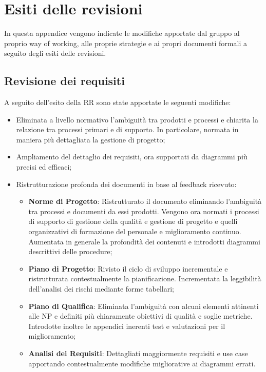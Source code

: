 \documentclass[openany,12pt,a4paper]{report}
\begin{document}
\chapter{Esiti delle revisioni}

In questa appendice vengono indicate le modifiche apportate dal gruppo al proprio way of working, alle proprie strategie e ai propri documenti formali a seguito degli esiti delle revisioni.

\section{Revisione dei requisiti}

A seguito dell'esito della RR sono state apportate le seguenti modifiche:

\begin{itemize}
	\item Eliminata a livello normativo l’ambiguità tra prodotti e processi e chiarita la relazione tra processi primari e di supporto. In particolare, normata in maniera più dettagliata la gestione di progetto;
	\item Ampliamento del dettaglio dei requisiti, ora supportati da diagrammi più precisi ed efficaci;
	\item Ristrutturazione profonda dei documenti in base al feedback ricevuto:
	\begin{itemize}
		\item \textbf{Norme di Progetto}: Ristrutturato il documento eliminando l'ambiguità tra processi e documenti da essi prodotti. Vengono ora normati i processi di supporto di gestione della qualità e gestione di progetto e quelli organizzativi di formazione del personale e miglioramento continuo. Aumentata in generale la profondità dei contenuti e introdotti diagrammi descrittivi delle procedure;
		\item \textbf{Piano di Progetto}: Rivisto il ciclo di sviluppo incrementale e ristrutturata contestualmente la pianificazione. Incrementata la leggibilità dell'analisi dei rischi mediante forme tabellari;
		\item \textbf{Piano di Qualifica}: Eliminata l'ambiguità con alcuni elementi attinenti alle NP e definiti più chiaramente obiettivi di qualità e soglie metriche. Introdotte inoltre le appendici inerenti test e valutazioni per il miglioramento;
		\item \textbf{Analisi dei Requisiti}: Dettagliati maggiormente requisiti e use case apportando contestualmente modifiche migliorative ai diagrammi errati.
	\end{itemize}
\end{itemize}
\end{document}
